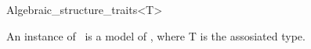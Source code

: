 \begin{ccRefClass}{Algebraic_structure_traits<T>}

\ccDefinition

An instance of \ccClassTemplateName\ is a model of , where {\sc T} is the assosiated type. 


\ccSeeAlso
{}\\

\end{ccRefClass} 